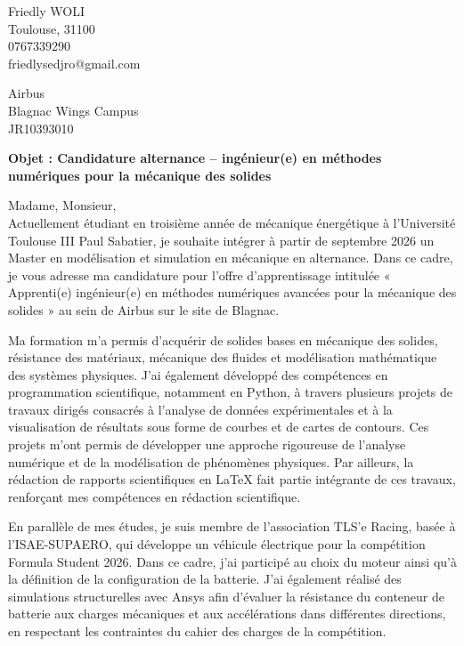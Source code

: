 \documentclass[11pt,a4paper]{article}
\begin{document}
	\pagestyle{empty}
	
	\noindent
	Friedly WOLI \\
	Toulouse, 31100 \\
	0767339290 \\
	friedlysedjro@gmail.com
	
	\begin{flushright}
		Airbus \\
		Blagnac Wings Campus\\
		JR10393010
	\end{flushright}
	
	\bigskip
	
	\textbf{Objet : Candidature alternance – ingénieur(e) en méthodes numériques pour la mécanique des solides }
	
	\bigskip
	
Madame, Monsieur,\\

Actuellement étudiant en troisième année de mécanique énergétique à l'Université Toulouse III Paul Sabatier, je souhaite intégrer à partir de septembre 2026 un Master en modélisation et simulation en mécanique en alternance. Dans ce cadre, je vous adresse ma candidature pour l'offre d'apprentissage intitulée « Apprenti(e) ingénieur(e) en méthodes numériques avancées pour la mécanique des solides » au sein de Airbus sur le site de Blagnac.

Ma formation m’a permis d’acquérir de solides bases en mécanique des solides, résistance des matériaux, mécanique des fluides et modélisation mathématique des systèmes physiques. J’ai également développé des compétences en programmation scientifique, notamment en Python, à travers plusieurs projets de travaux dirigés consacrés à l’analyse de données expérimentales et à la visualisation de résultats sous forme de courbes et de cartes de contours. Ces projets m’ont permis de développer une approche rigoureuse de l’analyse numérique et de la modélisation de phénomènes physiques. Par ailleurs, la rédaction de rapports scientifiques en LaTeX fait partie intégrante de ces travaux, renforçant mes compétences en rédaction scientifique.

En parallèle de mes études, je suis membre de l’association TLS'e Racing, basée à l’ISAE-SUPAERO, qui développe un véhicule électrique pour la compétition Formula Student 2026. Dans ce cadre, j’ai participé au choix du moteur ainsi qu’à la définition de la configuration de la batterie. J’ai également réalisé des simulations structurelles avec Ansys afin d’évaluer la résistance du conteneur de batterie aux charges mécaniques et aux accélérations dans différentes directions, en respectant les contraintes du cahier des charges de la compétition.
\end{document}
